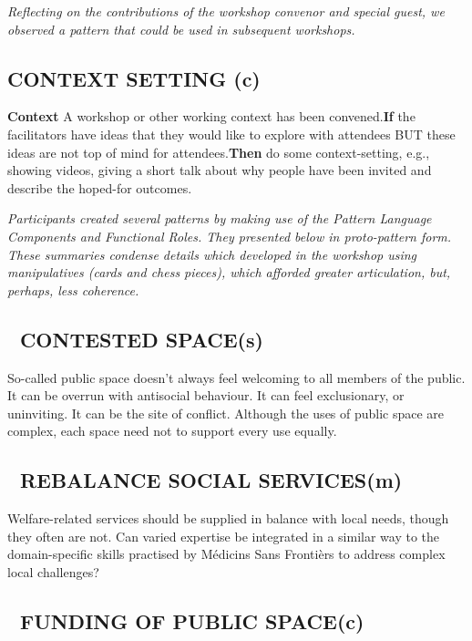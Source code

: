 \documentclass[acmlarge,timestamp]{acmart}
\newcommand{\sensory}{(s)}
\newcommand{\cognitive}{(c)}
\newcommand{\motor}{(m)}
\begin{document}
\noindent \emph{Reflecting on the contributions of the workshop
convenor and special guest, we observed a pattern that could be used
in subsequent workshops.}

\subsection*{CONTEXT SETTING {\hfill \cognitive}}
\textbf{Context} A workshop or other working context has been
convened.\newline \textbf{If} the facilitators have ideas that they
would like to explore with attendees BUT these ideas are not top of
mind for attendees.\newline \textbf{Then} do some context-setting,
e.g., showing videos, giving a short talk about why people have been
invited and describe the hoped-for outcomes.

\smallskip

\noindent \emph{Participants created several patterns by making use of
the {\sc Pattern Language Components} and {\sc Functional Roles}.
They presented below in  proto-pattern form.  These summaries
condense details which developed in the workshop using manipulatives
(cards and chess pieces), which afforded greater articulation, but,
perhaps, less coherence.}


\subsection*{💎 CONTESTED SPACE{\hfill \sensory}}\label{pat:contested-space}

So-called public space doesn’t always feel welcoming to all members of the public.  It can be overrun with antisocial behaviour.  It can feel exclusionary, or uninviting.  It can be the site of conflict.  Although the uses of public space are complex, each space need not to support every use equally.

\subsection*{💎 REBALANCE SOCIAL SERVICES{\hfill \motor}}\label{pat:rebalance-social-services}

Welfare-related services should be supplied in balance with local needs, though they often are not. Can varied expertise be integrated in a similar way to the domain-specific skills practised by Médicins Sans Frontièrs to address complex local challenges?

\subsection*{💎 FUNDING OF PUBLIC SPACE{\hfill \cognitive}}\label{pat:funding-of-public-space}
\end{document}
